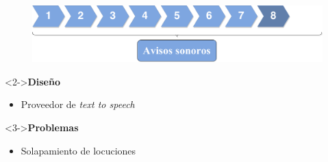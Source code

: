 \begin{slide}
  \begin{center}
    \begin{figure}[!h]
      \includegraphics[height=0.27\textheight]{img/ite8.png}
    \end{figure}
    \vspace{0.5cm}
    \begin{minipage}[b]{0.4\linewidth}
      \begin{block}<2->{\textbf{Diseño}}
        \begin{itemize}
          \item Proveedor de \emph{text to speech}
        \end{itemize}
      \end{block}
    \end{minipage}
    \hspace{0.5cm}
    \begin{minipage}[b]{0.4\linewidth}
      \begin{block}<3->{\textbf{Problemas}}
        \begin{itemize}
          \item Solapamiento de locuciones
        \end{itemize}
      \end{block}
    \end{minipage}
  \end{center}
\end{slide}

